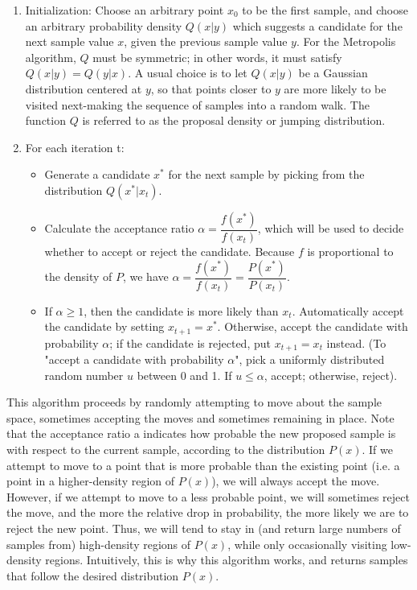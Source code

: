 \documentclass[11pt]{article}
\numberwithin{equation}{section}
\begin{document}
\begin{enumerate}
	\item Initialization: Choose an arbitrary point $x_0$ to be the first sample, and choose an arbitrary probability density $Q\left(x | y\right)$ which suggests a candidate for the next sample value $x$, given the previous sample value $y$. For the Metropolis algorithm, $Q$ must be symmetric; in other words, it must satisfy $Q\left(x | y\right) = Q\left(y | x\right)$. A usual choice is to let $Q\left(x | y\right)$ be a Gaussian distribution centered at $y$, so that points closer to $y$ are more likely to be visited next-making the sequence of samples into a random walk. The function $Q$ is referred to as the proposal density or jumping distribution.

	\item For each iteration t:
	\begin{itemize}
		\item Generate a candidate $x^\ast$ for the next sample by picking from the distribution $Q\left(x^\ast | x_t\right)$.

		\item Calculate the acceptance ratio $\alpha = \dfrac{f\left(x^\ast\right)}{f\left(x_t\right)}$, which will be used to decide whether to accept or reject the candidate. Because $f$ is proportional to the density of $P$, we have $\alpha = \dfrac{f\left(x^\ast\right)}{f\left(x_t\right)} = \dfrac{P\left(x^\ast\right)}{P\left(x_t\right)}$.

		\item If $\alpha \geq 1$, then the candidate is more likely than $x_t$. Automatically accept the candidate by setting $x_{t+1} = x^\ast$. Otherwise, accept the candidate with probability $\alpha$; if the candidate is rejected, put $x_{t+1} = x_t$ instead. (To "accept a candidate with probability $\alpha$", pick a uniformly distributed random number $u$ between 0 and 1. If $u \leq \alpha$, accept; otherwise, reject).
	\end{itemize}
\end{enumerate}
\medskip

This algorithm proceeds by randomly attempting to move about the sample space, sometimes accepting the moves and sometimes remaining in place. Note that the acceptance ratio a indicates how probable the new proposed sample is with respect to the current sample, according to the distribution $P\left(x\right)$. If we attempt to move to a point that is more probable than the existing point (i.e. a point in a higher-density region of $P\left(x\right)$), we will always accept the move. However, if we attempt to move to a less probable point, we will sometimes reject the move, and the more the relative drop in probability, the more likely we are to reject the new point. Thus, we will tend to stay in (and return large numbers of samples from) high-density regions of $P\left(x\right)$, while only occasionally visiting low-density regions. Intuitively, this is why this algorithm works, and returns samples that follow the desired distribution $P\left(x\right)$. \medskip
\end{document}
